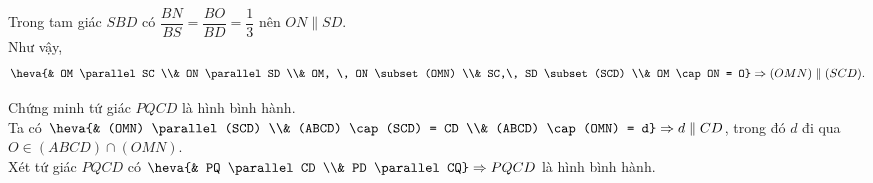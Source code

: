 \begin{vd}
{\begin{listEX}
Trong tam giác $ SBD$ có $\dfrac{BN}{BS} =\dfrac{BO}{BD}=\dfrac{1}{3}$ nên $ON \parallel SD$.\\
Như vậy, $$\heva{&  OM \parallel SC \\& ON \parallel SD \\& OM, \, ON \subset (OMN) \\& SC,\,  SD \subset (SCD) \\& OM \cap ON = O} \Rightarrow (OMN) \parallel (SCD).$$
\item Chứng minh tứ giác $ PQCD$ là hình bình hành.
\\
Ta có $\heva{& (OMN) \parallel (SCD) \\& (ABCD) \cap (SCD) = CD \\& (ABCD) \cap (OMN) = d} \Rightarrow d \parallel CD$, trong đó $d$ đi qua $O \in (ABCD) \cap (OMN)$.\\
Xét tứ giác $PQCD$ có $\heva{& PQ \parallel CD \\& PD \parallel CQ} \Rightarrow PQCD$ là hình bình hành.
\end{listEX}}	
\end{vd}

